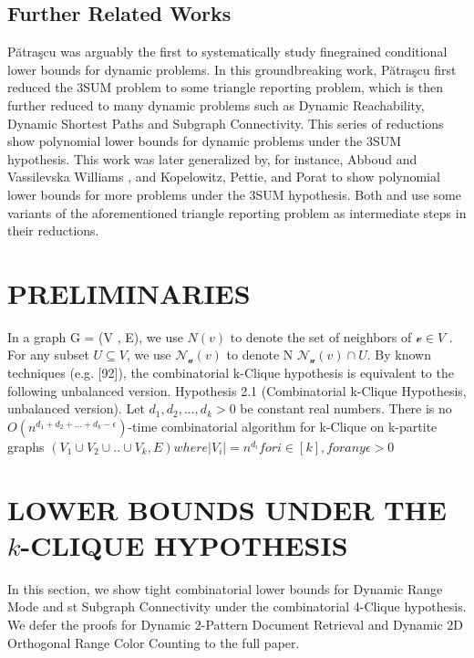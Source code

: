 \documentclass[preprint,10pt]{elsarticle}
\begin{document}
\begin{multicols}{2}
\subsection{Further Related Works}
Pătraşcu \cite{10.1145/1806689.1806772} was arguably the first to systematically study finegrained conditional lower bounds for dynamic problems. In this
groundbreaking work, Pătraşcu first reduced the 3SUM problem to
some triangle reporting problem, which is then further reduced to
many dynamic problems such as Dynamic Reachability, Dynamic
Shortest Paths and Subgraph Connectivity. This series of reductions
show polynomial lower bounds for dynamic problems under the
3SUM hypothesis. This work was later generalized by, for instance,
Abboud and Vassilevska Williams \cite{6979028}, and Kopelowitz, Pettie, and
Porat \cite{doi:10.1137/1.9781611974331.ch89} to show polynomial lower bounds for more problems
under the 3SUM hypothesis. Both \cite{6979028} and \cite{doi:10.1137/1.9781611974331.ch89} use some variants
of the aforementioned triangle reporting problem as intermediate
steps in their reductions.

\section{PRELIMINARIES}
In a graph G = (V , E), we use $N(v)$ to denote the set of neighbors of $\mathcal{v} \in  V$ . For any subset $U \subseteq V $, we use $\mathcal{N_u}(v)$ to denote N $\mathcal{N_u}(v) \cap U $.
By known techniques (e.g. [92]), the combinatorial k-Clique
hypothesis is equivalent to the following unbalanced version.
Hypothesis 2.1\label{2.1} (Combinatorial k-Clique Hypothesis, unbalanced
version). Let $d_1,d_2,...,d_k>0$ be constant real numbers. There is
no $O(n^{d_1+d_2+...+d_k-\epsilon})$-time combinatorial algorithm for k-Clique on
k-partite graphs $(V_1\cup V_2 \cup..\cup V_k,E) where |V_i|=n^{d_i} for i \in [k],for any \epsilon>0$


\section{LOWER BOUNDS UNDER THE $k$-CLIQUE HYPOTHESIS}
In this section, we show tight combinatorial lower bounds for Dynamic Range Mode and st Subgraph Connectivity under the combinatorial 4-Clique hypothesis. We defer the proofs for Dynamic 2-Pattern Document Retrieval and Dynamic 2D Orthogonal Range
Color Counting to the full paper.


\end{multicols}
\end{document}
